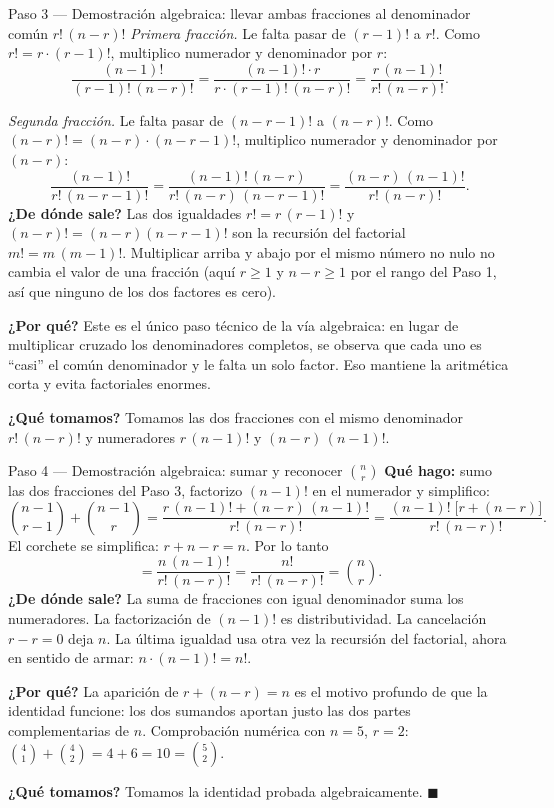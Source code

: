 \documentclass[11pt]{article}
\begin{document}
\begin{sol}
\begin{paso}{Paso 3 --- Demostración algebraica: llevar ambas fracciones al denominador común $r!\,(n-r)!$}
\emph{Primera fracción.} Le falta pasar de $(r-1)!$ a $r!$. Como $r!=r\cdot(r-1)!$, multiplico
numerador y denominador por $r$:
\[
\frac{(n-1)!}{(r-1)!\,(n-r)!}
=\frac{(n-1)!\cdot r}{r\cdot (r-1)!\,(n-r)!}
=\frac{r\,(n-1)!}{r!\,(n-r)!}.
\]

\emph{Segunda fracción.} Le falta pasar de $(n-r-1)!$ a $(n-r)!$. Como
$(n-r)!=(n-r)\cdot(n-r-1)!$, multiplico numerador y denominador por $(n-r)$:
\[
\frac{(n-1)!}{r!\,(n-r-1)!}
=\frac{(n-1)!\,(n-r)}{r!\,(n-r)\,(n-r-1)!}
=\frac{(n-r)\,(n-1)!}{r!\,(n-r)!}.
\]
\textbf{¿De dónde sale?} Las dos igualdades $r!=r\,(r-1)!$ y $(n-r)!=(n-r)(n-r-1)!$ son la
recursión del factorial $m!=m\,(m-1)!$. Multiplicar arriba y abajo por el mismo número no nulo
no cambia el valor de una fracción (aquí $r\ge 1$ y $n-r\ge 1$ por el rango del Paso 1, así
que ninguno de los dos factores es cero).

\textbf{¿Por qué?} Este es el único paso técnico de la vía algebraica: en lugar de multiplicar
cruzado los denominadores completos, se observa que cada uno es ``casi'' el común denominador
y le falta un solo factor. Eso mantiene la aritmética corta y evita factoriales enormes.

\textbf{¿Qué tomamos?} Tomamos las dos fracciones con el mismo denominador $r!\,(n-r)!$ y
numeradores $r\,(n-1)!$ y $(n-r)\,(n-1)!$.
\end{paso}

\begin{paso}{Paso 4 --- Demostración algebraica: sumar y reconocer $\binom{n}{r}$}
\textbf{Qué hago:} sumo las dos fracciones del Paso 3, factorizo $(n-1)!$ en el numerador y
simplifico:
\[
\binom{n-1}{r-1}+\binom{n-1}{r}
=\frac{r\,(n-1)!+(n-r)\,(n-1)!}{r!\,(n-r)!}
=\frac{(n-1)!\;\bigl[r+(n-r)\bigr]}{r!\,(n-r)!}.
\]
El corchete se simplifica: $r+n-r=n$. Por lo tanto
\[
=\frac{n\,(n-1)!}{r!\,(n-r)!}=\frac{n!}{r!\,(n-r)!}=\binom{n}{r}.
\]
\textbf{¿De dónde sale?} La suma de fracciones con igual denominador suma los numeradores. La
factorización de $(n-1)!$ es distributividad. La cancelación $r-r=0$ deja $n$. La última
igualdad usa otra vez la recursión del factorial, ahora en sentido de armar:
$n\cdot(n-1)!=n!$.

\textbf{¿Por qué?} La aparición de $r+(n-r)=n$ es el motivo profundo de que la identidad
funcione: los dos sumandos aportan justo las dos partes complementarias de $n$. Comprobación
numérica con $n=5$, $r=2$: $\binom{4}{1}+\binom{4}{2}=4+6=10=\binom{5}{2}$.

\textbf{¿Qué tomamos?} Tomamos la identidad probada algebraicamente. $\blacksquare$
\end{paso}


\end{sol}
\end{document}
